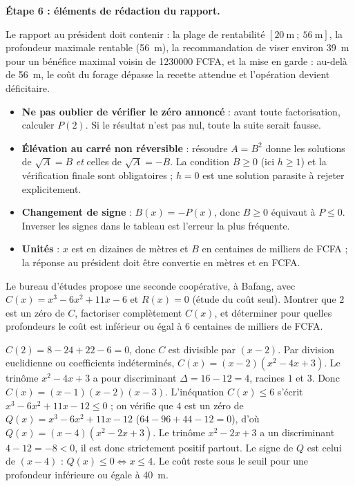 \documentclass[11pt]{article}
\begin{document}
\begin{exoresolu}
\textbf{Étape 6 : éléments de rédaction du rapport.}

Le rapport au président doit contenir : la plage de rentabilité $[20\ \text{m}\ ;\ 56\ \text{m}]$, la profondeur maximale rentable (\SI{56}{m}), la recommandation de viser environ \SI{39}{m} pour un bénéfice maximal voisin de \num{1230000} FCFA, et la mise en garde : au-delà de \SI{56}{m}, le coût du forage dépasse la recette attendue et l'opération devient déficitaire.
\end{exoresolu}

\begin{attention}
\begin{itemize}
\item \textbf{Ne pas oublier de vérifier le zéro annoncé} : avant toute factorisation, calculer $P(2)$. Si le résultat n'est pas nul, toute la suite serait fausse.
\item \textbf{Élévation au carré non réversible} : résoudre $A=B^{2}$ donne les solutions de $\sqrt{A}=B$ \emph{et} celles de $\sqrt{A}=-B$. La condition $B\geq 0$ (ici $h\geq 1$) et la vérification finale sont obligatoires ; $h=0$ est une solution parasite à rejeter explicitement.
\item \textbf{Changement de signe} : $B(x)=-P(x)$, donc $B\geq 0$ équivaut à $P\leq 0$. Inverser les signes dans le tableau est l'erreur la plus fréquente.
\item \textbf{Unités} : $x$ est en dizaines de mètres et $B$ en centaines de milliers de FCFA ; la réponse au président doit être convertie en mètres et en FCFA.
\end{itemize}
\end{attention}

\begin{exercice}
Le bureau d'études propose une seconde coopérative, à Bafang, avec $C(x)=x^{3}-6x^{2}+11x-6$ et $R(x)=0$ (étude du coût seul). Montrer que $2$ est un zéro de $C$, factoriser complètement $C(x)$, et déterminer pour quelles profondeurs le coût est inférieur ou égal à $6$ centaines de milliers de FCFA.
\end{exercice}

\begin{corrige}
$C(2)=8-24+22-6=0$, donc $C$ est divisible par $(x-2)$. Par division euclidienne ou coefficients indéterminés, $C(x)=(x-2)(x^{2}-4x+3)$. Le trinôme $x^{2}-4x+3$ a pour discriminant $\Delta=16-12=4$, racines $1$ et $3$. Donc $C(x)=(x-1)(x-2)(x-3)$. L'inéquation $C(x)\leq 6$ s'écrit $x^{3}-6x^{2}+11x-12\leq 0$ ; on vérifie que $4$ est un zéro de $Q(x)=x^{3}-6x^{2}+11x-12$ ($64-96+44-12=0$), d'où $Q(x)=(x-4)(x^{2}-2x+3)$. Le trinôme $x^{2}-2x+3$ a un discriminant $4-12=-8<0$, il est donc strictement positif partout. Le signe de $Q$ est celui de $(x-4)$ : $Q(x)\leq 0\iff x\leq 4$. Le coût reste sous le seuil pour une profondeur inférieure ou égale à \SI{40}{m}.
\end{corrige}
\end{document}
